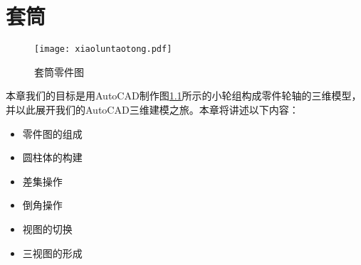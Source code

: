 \chapter{套筒}
\begin{figure}[htbp]
\centering
\texttt{[image: xiaoluntaotong.pdf]}
\caption{套筒零件图}\label{fig:xiaoluntaotong}
\end{figure}
本章我们的目标是用AutoCAD制作图\ref{fig:xiaoluntaotong}所示的小轮组构成零件轮轴的三维模型，并以此展开我们的AutoCAD三维建模之旅。本章将讲述以下内容：
\begin{itemize}
	\item 零件图的组成
	\item 圆柱体的构建
	\item 差集操作
	\item 倒角操作
	\item 视图的切换
	\item 三视图的形成
\end{itemize}

\endinput